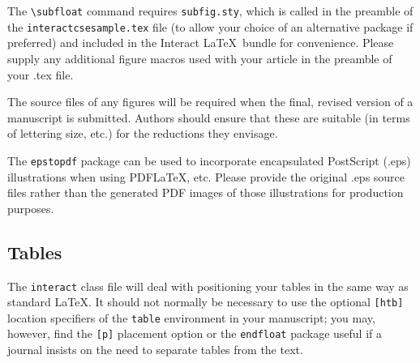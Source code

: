 \documentclass[]{interact}
\theoremstyle{plain}%
\theoremstyle{definition}
\theoremstyle{remark}
\begin{document}
The \verb"\subfloat" command requires \verb"subfig.sty", which is called in the preamble of the \texttt{interactcsesample.tex} file (to allow your choice of an alternative package if preferred) and included in the \textsf{Interact} \LaTeX\ bundle for convenience. Please supply any additional figure macros used with your article in the preamble of your .tex file.

The source files of any figures will be required when the final, revised version of a manuscript is submitted. Authors should ensure that these are suitable (in terms of lettering size, etc.) for the reductions they envisage.

The \texttt{epstopdf} package can be used to incorporate encapsulated PostScript (.eps) illustrations when using PDF\LaTeX, etc. Please provide the original .eps source files rather than the generated PDF images of those illustrations for production purposes.


\subsection{Tables}

The \texttt{interact} class file will deal with positioning your tables in the same way as standard \LaTeX. It should not normally be necessary to use the optional \texttt{[htb]} location specifiers of the \texttt{table} environment in your manuscript; you may, however, find the \verb"[p]" placement option or the \verb"endfloat" package useful if a journal insists on the need to separate tables from the text.
\end{document}
